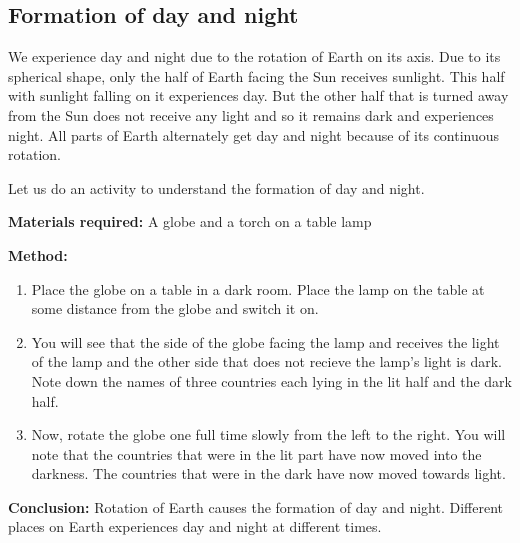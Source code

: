 \subsection{\textbf{Formation of day and night}}
We experience day and night due to the rotation of Earth on its axis. Due to its spherical shape, only the half of Earth facing the Sun receives sunlight. This half with sunlight falling on it experiences day. But the other half that is turned away from the Sun does not receive any light and so it remains dark and experiences night. All parts of Earth alternately get day and night because of its continuous rotation.
\par
\vspace{0.23in}
Let us do an activity to understand the formation of day and night.
\par
\vspace{0.1in}
\textbf{Materials required:} A globe and a torch on a table lamp
\par
\vspace{0.1in}
\textbf{Method:}
\vspace{0.1in}
\begin{enumerate}
    \item Place the globe on a table in a dark room. Place the lamp on the table at some distance from the globe and switch it on.
    \item You will see that the side of the globe facing the lamp and receives the light of the lamp and the other side that does not recieve the lamp's light is   dark. Note down the names of three countries each lying in the lit half and the dark half.
    \item Now, rotate the globe one full time slowly from the left to the right. You will note that the countries that were in the lit part have now moved into the darkness. The countries that were in the dark have now moved towards light.
\end{enumerate}
\vspace{0.1in}
\par
\textbf{Conclusion:} Rotation of Earth causes the formation of day and night. Different places on Earth experiences day and night at different times.
\par
\vspace{0.17in}

